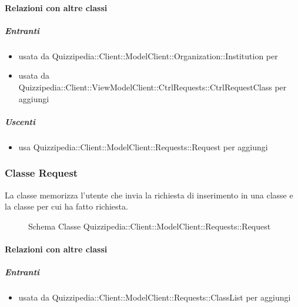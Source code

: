 \paragraph{Relazioni con altre classi}
\subparagraph{Entranti}
\begin{itemize}
\item usata da Quizzipedia::Client::ModelClient::Organization::Institution per 
\item usata da Quizzipedia::Client::ViewModelClient::CtrlRequests::CtrlRequestClass per aggiungi
\end{itemize}
\subparagraph{Uscenti}
\begin{itemize}
\item usa Quizzipedia::Client::ModelClient::Requests::Request per aggiungi
\end{itemize}
\subsubsection{Classe Request}
La classe memorizza l'utente che invia la richiesta di inserimento in una classe e la classe per cui ha fatto richiesta.
\begin{figure}[H]
\centering
\noindent{}
\caption[Schema Classe Request]{Schema Classe Quizzipedia::Client::ModelClient::Requests::Request}
\end{figure}
\paragraph{Relazioni con altre classi}
\subparagraph{Entranti}
\begin{itemize}
\item usata da Quizzipedia::Client::ModelClient::Requests::ClassList per aggiungi
\end{itemize}

